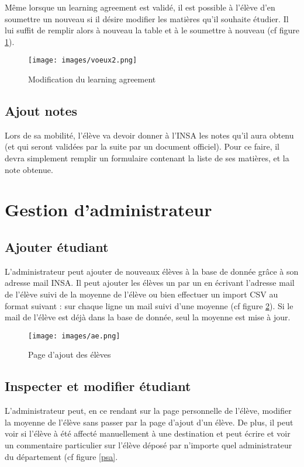 Même lorsque un learning agreement est validé, il est possible à l'élève d'en soumettre un nouveau si il désire modifier les matières qu'il souhaite étudier. Il lui suffit de remplir alors à nouveau la table et à le soumettre à nouveau (cf figure \ref{voeux2}).

\begin{figure}[H]
	\centering
	\texttt{[image: images/voeux2.png]}
	\caption{Modification du learning agreement}
	\label{voeux2}
\end{figure}

\subsection{Ajout notes}

Lors de sa mobilité, l'élève va devoir donner à l'INSA les notes qu'il aura obtenu (et qui seront validées par la suite par un document officiel). Pour ce faire, il devra simplement remplir un formulaire contenant la liste de ses matières, et la note obtenue.

\section{Gestion d'administrateur}

\subsection{Ajouter étudiant}

L'administrateur peut ajouter de nouveaux élèves à la base de donnée grâce à son adresse mail INSA. Il peut ajouter les élèves un par un en écrivant l'adresse mail de l'élève suivi de la moyenne de l'élève ou bien effectuer un import CSV au format suivant : sur chaque ligne un mail suivi d'une moyenne (cf figure \ref{ae}).
\smallbreak
Si le mail de l'élève est déjà dans la base de donnée, seul la moyenne est mise à jour.

\begin{figure}[H]
	\centering
	\texttt{[image: images/ae.png]}
	\caption{Page d'ajout des élèves}
	\label{ae}
\end{figure}

\subsection{Inspecter et modifier étudiant} 

L'administrateur peut, en ce rendant sur la page personnelle de l'élève, modifier la moyenne de l'élève sans passer par la page d'ajout d'un élève. De plus, il peut voir si l'élève à été affecté manuellement à une destination et peut écrire et voir un commentaire particulier sur l'élève déposé par n'importe quel administrateur du département (cf figure \ref{psa}.


